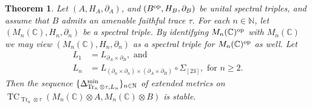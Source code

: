 \documentclass[11pt, a4paper, oneside, final, reqno]{amsart}
\newcommand{\bbN}{\mathbb{N}}
\newcommand{\bbC}{\mathbb{C}}
\newcommand{\TC}{\operatorname{TC}}
\newcommand{\Tr}{\operatorname{Tr}}
\theoremstyle{definition}
\theoremstyle{plain}
\newtheorem{theorem}[definition]{Theorem}
\theoremstyle{remark}
\numberwithin{equation}{section}
\begin{document}
\begin{theorem}\label{thm:stability 2}
    Let $(A,H_A,\partial_A)$, and $(B^{\rm op},H_B,\partial_B)$ be unital spectral triples, and assume that $B$ admits an amenable faithful trace $\tau$. For each $n \in \bbN$, let $(M_n(\bbC),H_n,\partial_n)$ be a spectral triple. By identifying $M_n(\bbC)^{\rm op}$ with $M_n(\bbC)$ we may view $(M_n(\bbC),H_n,\partial_n)$ as a spectral triple for $M_n(\bbC)^{\rm op}$ as well. Let
    \begin{align*}
        L_1 & = L_{\partial_A \times \partial_B}, \text{ and } \\
        L_n & = L_{(\partial_n \times \partial_n) \times (\partial_A \times \partial_B)} \circ \Sigma_{[23]}, \text{ for } n \geq 2.
    \end{align*}
    Then the sequence $\{\Delta_{\Tr_n \otimes \tau, L_n}^{\rm min}\}_{n \in \bbN}$ of extended metrics on $\TC_{\Tr_n \otimes \tau}(M_n(\bbC) \otimes A, M_n(\bbC) \otimes B)$ is stable.
\end{theorem}
\end{document}
